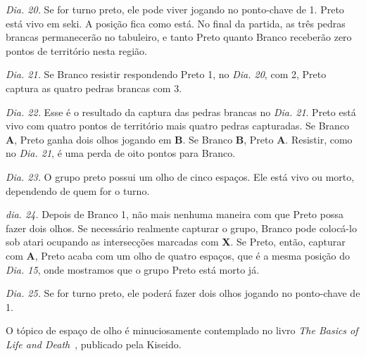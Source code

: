 \emph{Dia. 20.} Se for turno preto, ele pode viver jogando no ponto-chave de 1. Preto está vivo em seki. A posição fica como está. No final da partida, as três pedras brancas permanecerão no tabuleiro, e tanto Preto quanto Branco receberão zero pontos de território nesta região.

\emph{Dia. 21.} Se Branco resistir respondendo Preto 1, no \emph{Dia. 20}, com 2, Preto captura as quatro pedras brancas com 3.

\emph{Dia. 22.} Esse é o resultado da captura das pedras brancas no \emph{Dia. 21}. Preto está vivo com quatro pontos de território mais quatro pedras capturadas. Se Branco \textbf{A}, Preto ganha dois olhos jogando em \textbf{B}. Se Branco \textbf{B}, Preto \textbf{A}. Resistir, como no \emph{Dia. 21}, é uma perda de oito pontos para Branco.

\emph{Dia. 23.} O grupo preto possui um olho de cinco espaços. Ele está vivo ou morto, dependendo de quem for o turno.

\emph{dia. 24.} Depois de Branco 1, não mais nenhuma maneira com que Preto possa fazer dois olhos. Se necessário realmente capturar o grupo, Branco pode colocá-lo sob atari ocupando as intersecções marcadas com \textbf{X}. Se Preto, então, capturar com \textbf{A}, Preto acaba com um olho de quatro espaços, que é a mesma posição do \emph{Dia. 15}, onde mostramos que o grupo Preto está morto já.

\emph{Dia. 25.} Se for turno preto, ele poderá fazer dois olhos jogando no ponto-chave de 1.

O tópico de espaço de olho é minuciosamente contemplado no livro \emph{The Basics of Life and Death}~\cite{zeijst_bozulich_basics_of_life_and_death}, publicado pela Kiseido.